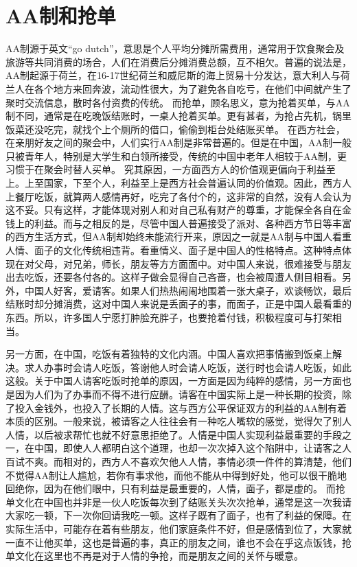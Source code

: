 \section{AA制和抢单}
AA制源于英文“go dutch”，意思是个人平均分摊所需费用，通常用于饮食聚会及旅游等共同消费的场合，人们在消费后分摊消费总额，互不相欠。普遍的说法是，AA制起源于荷兰，在16-17世纪荷兰和威尼斯的海上贸易十分发达，意大利人与荷兰人在各个地方来回奔波，流动性很大，为了避免各自吃亏，在他们中间就产生了聚时交流信息，散时各付资费的传统。
而抢单，顾名思义，意为抢着买单，与AA制不同，通常是在吃晚饭结账时，一桌人抢着买单。更有甚者，为抢占先机，锅里饭菜还没吃完，就找个上个厕所的借口，偷偷到柜台处结账买单。
在西方社会，在亲朋好友之间的聚会中，人们实行AA制是非常普遍的。但是在中国，AA制一般只被青年人，特别是大学生和白领所接受，传统的中国中老年人相较于AA制，更习惯于在聚会时替人买单。
究其原因，一方面西方人的价值观更偏向于利益至上。上至国家，下至个人，利益至上是西方社会普遍认同的价值观。因此，西方人上餐厅吃饭，就算两人感情再好，吃完了各付个的，这非常的自然，没有人会认为这不妥。只有这样，才能体现对别人和对自己私有财产的尊重，才能保全各自在金钱上的利益。而与之相反的是，尽管中国人普遍接受了派对、各种西方节日等丰富的西方生活方式，但AA制却始终未能流行开来，原因之一就是AA制与中国人看重人情、面子的文化传统相违背。看重情义、面子是中国人的性格特点。这种特点体现在对父母，对兄弟，师长，朋友等方方面面中。对中国人来说，很难接受与朋友出去吃饭，还要各付各的。这样子做会显得自己吝啬，也会被周遭人侧目相看。另外，中国人好客，爱请客。如果人们热热闹闹地围着一张大桌子，欢谈畅饮，最后结账时却分摊消费，这对中国人来说是丢面子的事，而面子，正是中国人最看重的东西。所以，许多国人宁愿打肿脸充胖子，也要抢着付钱，积极程度可与打架相当。
\par
另一方面，在中国，吃饭有着独特的文化内涵。中国人喜欢把事情搬到饭桌上解决。求人办事时会请人吃饭，答谢他人时会请人吃饭，送行时也会请人吃饭，如此这般。关于中国人请客吃饭时抢单的原因，一方面是因为纯粹的感情，另一方面也是因为人们为了办事而不得不进行应酬。请客在中国实际上是一种长期的投资，除了投入金钱外，也投入了长期的人情。这与西方公平保证双方的利益的AA制有着本质的区别。一般来说，被请客之人往往会有一种吃人嘴软的感觉，觉得欠了别人人情，以后被求帮忙也就不好意思拒绝了。人情是中国人实现利益最重要的手段之一，在中国，即使人人都明白这个道理，也却一次次掉入这个陷阱中，让请客之人百试不爽。而相对的，西方人不喜欢欠他人人情，事情必须一件件的算清楚，他们不觉得AA制让人尴尬，若你有事求他，而他不能从中得到好处，他可以很干脆地回绝你，因为在他们眼中，只有利益是最重要的，人情，面子，都是虚的。
而抢单文化在中国也并非是一伙人吃饭每次到了结账关头次次抢单，通常是这一次我请大家吃一顿，下一次你回请我吃一顿。这样子既有了面子，也有了利益的保障。在实际生活中，可能存在着有些朋友，他们家庭条件不好，但是感情到位了，大家就一直不让他买单，这也是普遍的事，真正的朋友之间，谁也不会在乎这点饭钱，抢单文化在这里也不再是对于人情的争抢，而是朋友之间的关怀与暖意。